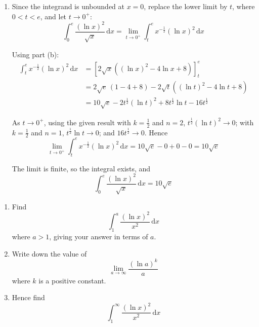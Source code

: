 \documentclass[leqno]{article}
\begin{document}
\begin{enumerate}[
  label=\textbf{\arabic*.},
  leftmargin=*,
  topsep=0pt,
  partopsep=0pt,
  parsep=0pt
]
\begin{djsSolution}
\begin{enumerate}[label=\textbf{(\alph*)}, start=1]
Combining the two results:
\begin{align*}
\int x^{-\frac12}(\ln x)^2\,\mathrm{d}x &= 2\sqrt{x}(\ln x)^2-4\left(2\sqrt{x}\ln x-4\sqrt{x}\right)+c\\
&= 2\sqrt{x}(\ln x)^2-8\sqrt{x}\ln x+16\sqrt{x}+c\\
&= 2\sqrt{x}\left((\ln x)^2-4\ln x+8\right)+c
\end{align*}

as required.

  \item Since the integrand is unbounded at \(x=0\), replace the lower limit by \(t\), where \(0<t<e\), and let \(t\to0^{+}\):
\[
\int_0^{e}\dfrac{(\ln x)^2}{\sqrt{x}}\,\mathrm{d}x=\lim_{t\to0^{+}}\int_t^{e}x^{-\frac12}(\ln x)^2\,\mathrm{d}x
\]

Using part (b):
\begin{align*}
\int_t^{e}x^{-\frac12}(\ln x)^2\,\mathrm{d}x &= \left[2\sqrt{x}\left((\ln x)^2-4\ln x+8\right)\right]_t^{e}\\
&= 2\sqrt{e}\,(1-4+8)-2\sqrt{t}\left((\ln t)^2-4\ln t+8\right)\\
&= 10\sqrt{e}-2t^{\frac12}(\ln t)^2+8t^{\frac12}\ln t-16t^{\frac12}
\end{align*}

As \(t\to0^{+}\), using the given result with \(k=\frac12\) and \(n=2\), \(t^{\frac12}(\ln t)^2\to0\); with \(k=\frac12\) and \(n=1\), \(t^{\frac12}\ln t\to0\); and \(16t^{\frac12}\to0\). Hence
\[
\lim_{t\to0^{+}}\int_t^{e}x^{-\frac12}(\ln x)^2\,\mathrm{d}x=10\sqrt{e}-0+0-0=10\sqrt{e}
\]

The limit is finite, so the integral exists, and
\[
\int_0^{e}\dfrac{(\ln x)^2}{\sqrt{x}}\,\mathrm{d}x=10\sqrt{e}
\]

\end{enumerate}
\end{djsSolution}

\newpage

\questionitem

\begin{enumerate}[label=\textbf{(\alph*)}]
  \item Find
  \[\int_1^a \dfrac{(\ln x)^2}{x^2}\,\mathrm{d}x\]
  where $a > 1$, giving your answer in terms of $a$.  \\
  \item Write down the value of
  \[\lim_{a \to \infty} \dfrac{(\ln a)^k}{a}\]
  where $k$ is a positive constant.  \\
  \item Hence find
  \[\int_1^{\infty} \dfrac{(\ln x)^2}{x^2}\,\mathrm{d}x\] 
\end{enumerate}


\end{enumerate}
\end{document}
